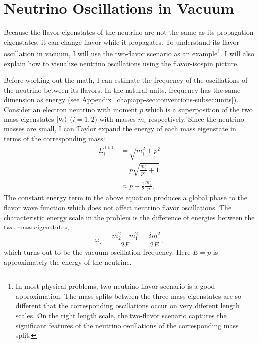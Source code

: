 

\chapter{\label{chap:basics}Neutrino Oscillations in Vacuum}

Because the flavor eigenstates of the neutrino are not the same as its propagation eigenstates, it can change flavor while it propagates. To understand its flavor oscillation in vacuum, I will use the two-flavor scenario as an example\footnote{In most physical problems, two-neutrino-flavor scenario is a good approximation. The mass splits between the three mass eigenstates are so different that the corresponding oscillations occur on very diferent length scales. On the right length scale, the two-flavor scenario captures the significant features of the neutrino oscillations of the corresponding mass split.}. I will also explain how to visualize neutrino oscillations using the flavor-isospin picture.

Before working out the math, I can estimate the frequency of the oscillations of the neutrino between its flavors. In the natural units, frequency has the same dimension as energy (see Appendix~\ref{chap:app-sec:conventions-subsec:units}). Consider an electron neutrino with moment $p$ which is a superposition of the two mass eigenstates $\left| \nu_i\right\rangle$ ($i=1,2$) with masses $m_i$ respectively. Since the neutrino masses are small, I can Taylor expand the energy of each mass eigenstate in terms of the corresponding mass:
\begin{align}
E_i^{(v)} & = \sqrt{m_i^2 + p^2 } \nonumber\\
& = p \sqrt{\frac{m_i^2}{p^2} + 1} \nonumber\\
& \approx p + \frac{1}{2} \frac{m_i^2}{p},
\label{chap:basics-section:neutrinos-eqn:energy-taylor}
\end{align}
The constant energy term in the above equation produces a global phase to the flavor wave function which does not affect neutrino flavor oscillations. The characteristic energy scale in the problem is the difference of energies between the two mass eigenstates,
\begin{equation}
    \omega_{\mathrm v} =  \frac{m_2^2-m_1^2}{2E} = \frac{\delta m^2}{2E},
    \label{chap:basics-section:neutrinos-eqn:qualitative-method-frequency}
\end{equation}
which turns out to be the vacuum oscillation frequency. Here $E=p$ is approximately the energy of the neutrino.

